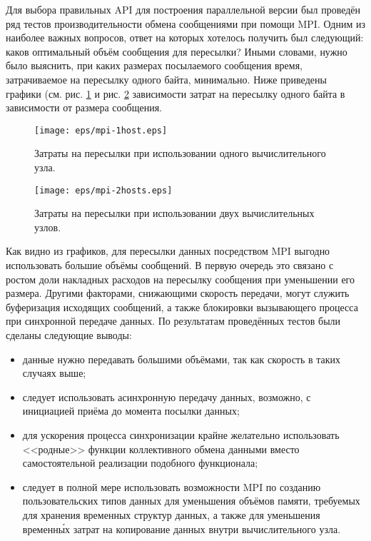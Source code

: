 Для выбора правильных API для построения параллельной версии был проведён ряд тестов производительности обмена сообщениями при помощи MPI. Одним из наиболее важных вопросов, ответ на которых хотелось получить был следующий: каков оптимальный объём сообщения для пересылки? Иными словами, нужно было выяснить, при каких размерах посылаемого сообщения время, затрачиваемое на пересылку одного байта, минимально.
Ниже приведены графики (см. рис. \ref{pic:mpi1host} и рис. \ref{pic:mpi2hosts} зависимости затрат на пересылку одного байта в зависимости от размера сообщения.
\begin{figure}[htp]
\centering
\texttt{[image: eps/mpi-1host.eps]}
\caption{Затраты на пересылки при использовании одного вычислительного
 узла.}
\label{pic:mpi1host}
\end{figure}
\begin{figure}[htp]
\centering
\texttt{[image: eps/mpi-2hosts.eps]}
\caption{Затраты на пересылки при использовании двух вычислительных узлов.}
\label{pic:mpi2hosts}
\end{figure}
Как видно из графиков, для пересылки данных посредством MPI выгодно использовать
большие объёмы сообщений. В первую очередь это связано с ростом доли накладных
расходов на пересылку сообщения при уменьшении его размера. Другими факторами,
снижающими скорость передачи, могут служить буферизация исходящих сообщений, а
также блокировки вызывающего процесса при синхронной передаче данных. По
результатам проведённых тестов были сделаны следующие выводы:
\begin{itemize}
	\item данные нужно передавать большими объёмами, так как скорость в таких случаях выше;
	\item следует использовать асинхронную передачу данных, возможно, с инициацией приёма до момента посылки данных;
	\item для ускорения процесса синхронизации крайне желательно использовать <<родные>> функции коллективного обмена данными вместо самостоятельной реализации подобного функционала;
	\item следует в полной мере использовать возможности MPI по созданию пользовательских типов данных для уменьшения объёмов памяти, требуемых для хранения временных структур данных, а также для уменьшения временн\'{ы}х затрат на копирование данных внутри вычислительного узла.
\end{itemize}

